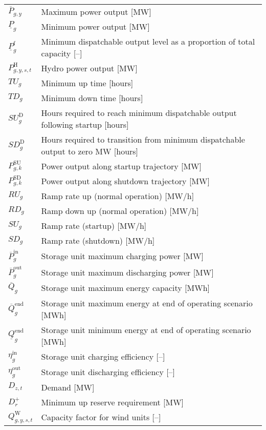 \documentclass{article}
\newcommand{\iGenerator}{g}
\newcommand{\iYear}{y}
\newcommand{\iScenario}{s}
\newcommand{\iInterval}{t}
\newcommand{\iIntervalAlias}{k}
\newcommand{\iZone}{z}
\newcommand{\iRegion}{r}
\newcommand{\cPowerOutputMax}[1][\iGenerator,\iYear]{\overline{P}_{#1}}
\newcommand{\cReserveUpRequirement}[1][\iRegion]{D^{+}_{#1}}
\newcommand{\cUpTimeMin}[1][\iGenerator]{TU_{#1}}
\newcommand{\cDownTimeMin}[1][\iGenerator]{TD_{#1}}
\newcommand{\cRampRateUp}[1][\iGenerator]{RU_{#1}}
\newcommand{\cRampRateDown}[1][\iGenerator]{RD_{#1}}
\newcommand{\cPowerOutputMin}[1][\iGenerator]{\underline{P}_{#1}}
\newcommand{\cStartupDuration}[1][\iGenerator]{SU_{#1}^{\mathrm{D}}}
\newcommand{\cStartupTrajectory}[1][\iGenerator,\iIntervalAlias]{P^{\mathrm{SU}}_{#1}}
\newcommand{\cShutdownDuration}[1][\iGenerator]{SD_{#1}^{\mathrm{D}}}
\newcommand{\cShutdownTrajectory}[1][\iGenerator,\iIntervalAlias]{P^{\mathrm{SD}}_{#1}}
\newcommand{\cCapacityFactorWind}[1][\iGenerator,\iYear,\iScenario,\iInterval]{Q_{#1}^{\mathrm{W}}}
\newcommand{\cPowerChargingMax}[1][\iGenerator]{\overline{P}^{\mathrm{in}}_{#1}}
\newcommand{\cPowerDischargingMax}[1][\iGenerator]{\overline{P}^{\mathrm{out}}_{#1}}
\newcommand{\cStorageUnitEnergyMax}[1][\iGenerator]{\overline{Q}_{#1}}
\newcommand{\cStorageUnitEnergyIntervalEndMax}[1][\iGenerator]{\overline{Q}^{\mathrm{end}}_{#1}}
\newcommand{\cStorageUnitEnergyIntervalEndMin}[1][\iGenerator]{\underline{Q}^{\mathrm{end}}_{#1}}
\newcommand{\cStorageUnitEfficiencyCharging}{\eta_{\iGenerator}^{\mathrm{in}}}
\newcommand{\cStorageUnitEfficiencyDischarging}{\eta_{\iGenerator}^{\mathrm{out}}}
\newcommand{\cDemand}[1][\iZone,\iInterval]{D_{#1}}
\newcommand{\cPowerOutputMinProportion}{\cPowerOutputMin^{\mathrm{f}}}
\newcommand{\cRampRateStartup}[1][\iGenerator]{SU_{#1}}
\newcommand{\cRampRateShutdown}[1][\iGenerator]{SD_{#1}}
\newcommand{\cPowerOutputHydro}[1][\iGenerator,\iYear,\iScenario,\iInterval]{P^{\mathrm{H}}_{#1}}
\begin{document}
\begin{longtable}{ p{}  p{}}
	$\cPowerOutputMax$ & Maximum power output [MW]\\
	$\cPowerOutputMin$ & Minimum power output [MW]\\
	$\cPowerOutputMinProportion$ & Minimum dispatchable output level as a proportion of total capacity [--]\\
	$\cPowerOutputHydro$ & Hydro power output [MW]\\
	$\cUpTimeMin$ & Minimum up time [hours]\\
	$\cDownTimeMin$ & Minimum down time [hours]\\
	$\cStartupDuration$ & Hours required to reach minimum dispatchable output following startup [hours]\\
	$\cShutdownDuration$ & Hours required to transition from minimum dispatchable output to zero MW [hours]\\
	$\cStartupTrajectory$ & Power output along startup trajectory [MW]\\
	$\cShutdownTrajectory$ & Power output along shutdown trajectory [MW]\\
	$\cRampRateUp$ & Ramp rate up (normal operation) [MW/h]\\
	$\cRampRateDown$ & Ramp down up (normal operation) [MW/h]\\
	$\cRampRateStartup$ & Ramp rate (startup) [MW/h]\\
	$\cRampRateShutdown$ & Ramp rate (shutdown) [MW/h]\\
	$\cPowerChargingMax$ & Storage unit maximum charging power [MW]\\
	$\cPowerDischargingMax$ & Storage unit maximum discharging power [MW]\\
	$\cStorageUnitEnergyMax$ & Storage unit maximum energy capacity [MWh]\\
	$\cStorageUnitEnergyIntervalEndMax$ & Storage unit maximum energy at end of operating scenario [MWh]\\
	$\cStorageUnitEnergyIntervalEndMin$ & Storage unit minimum energy at end of operating scenario [MWh]\\
	$\cStorageUnitEfficiencyCharging$ & Storage unit charging efficiency [--]\\
	$\cStorageUnitEfficiencyDischarging$ & Storage unit discharging efficiency [--]\\
	$\cDemand$ & Demand [MW]\\
	$\cReserveUpRequirement$ & Minimum up reserve requirement [MW]\\
	$\cCapacityFactorWind$ & Capacity factor for wind units [--]\\

\end{longtable}
\end{document}
